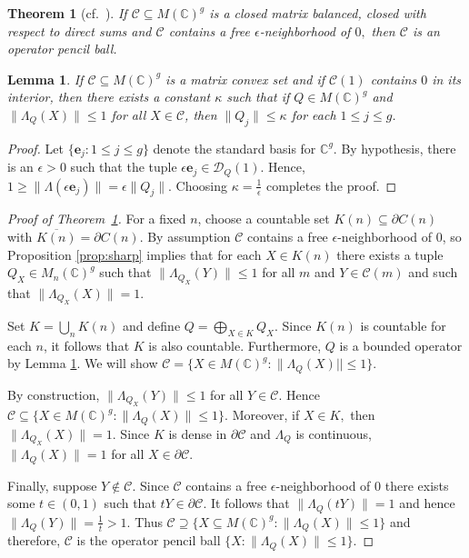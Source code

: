 \documentclass[12pt,makeidx]{amsart}
\newtheorem{lemma}[theorem]{Lemma}
\newtheorem{thm}[theorem]{Theorem}
\numberwithin{equation}{section}
\def\cD{ {{\mathcal D}}}
\def\bbF{ {\mathbb C}}
\def\cC{ {\mathcal C} }
\def\cD{ {\mathcal D} }
\def\be{\mathbf{e}}
\begin{document}
\begin{thm}[cf.~]
\label{thm:OperatorBall}
 If $\cC \subseteq M(\bbF)^g$ is a closed matrix balanced, closed with respect to direct sums  and  $\cC$ contains a free $\epsilon$-neighborhood of $0,$ then 
$\cC$ is an operator pencil ball.
\end{thm}

\begin{lemma}
 \label{lem:Qbounded}
   If $\cC \subseteq M(\bbF)^g$ is a matrix convex set and if $\cC(1)$ contains $0$ in its interior, then there exists a constant $\kappa$ such that if $Q\in M(\bbF)^g$ and $\|\Lambda_Q(X)\|\le 1$ for all $X\in \cC$, then $\|Q_j\|\le \kappa$ for each $1\le j\le g$.
\end{lemma}

\begin{proof}
 Let $\{\be_j:1\le j\le g\}$ denote the standard basis for $\bbF^g$.  By hypothesis, there is an $\epsilon>0$ such that the tuple $\epsilon \be_j \in \cD_Q(1)$. Hence, $1\ge \|\Lambda(\epsilon \be_j)\| = \epsilon \|Q_j\|$. Choosing $\kappa =\frac{1}{\epsilon}$ completes the proof.
\end{proof}

\begin{proof}[Proof of Theorem~\ref{thm:OperatorBall}]
For a fixed $n$, choose a countable set $K(n)\subseteq \partial C(n)$ with $\overline{K(n)}=\partial C(n)$. By assumption $\cC$ contains a free $\epsilon$-neighborhood of $0$, so Proposition \ref{prop:sharp} implies that for each $X \in K(n)$ there exists a tuple $Q_X\in M_n(\bbF)^g$ such that 
 $\|\Lambda_{Q_X} (Y)\|\le 1$ for all $m$ and
 $Y\in\cC(m)$  and such that  $\|\Lambda_{Q_X} (X)\|=1$. 

Set $K=\bigcup_n K(n)$ and define $Q=\bigoplus_{X \in K} Q_X
$. Since $K(n)$ is countable for each $n$, it follows that $K$ is also countable. Furthermore, 
$Q$ is a bounded operator by Lemma \ref{lem:Qbounded}.
 We will show $\cC=\{X \in M(\bbF)^g: \|\Lambda_Q(X)|| \leq 1 \}$.

By construction, $\|\Lambda_{Q_X} (Y)\| \leq 1$ for all $Y \in \cC.$ 
Hence $\cC \subseteq \{X\in M(\bbF)^g: \|\Lambda_Q(X)\| \le 1\}$. Moreover,
if $X \in K,$ then $\|\Lambda_{Q_X} (X) \|=1$.  Since $K$ is dense in $\partial \cC$ and $\Lambda_Q$ is continuous,  $\| \Lambda_Q (X) \|=1$ for all $X \in \partial \cC$.

Finally, suppose $Y \notin \cC$. Since $\cC$ contains a free $\epsilon$-neighborhood of $0$ there exists some  $t \in (0,1)$ such that $tY \in \partial \cC$. It follows that $\|\Lambda_Q (tY)\|=1$ and hence $\|\Lambda_Q (Y) \|=\frac{1}{t} >1$. Thus $\cC \supseteq\{X \subseteq M(\bbF)^g:\| \Lambda_Q (X) \|\leq 1\}$ and therefore, $\cC$ is the  operator pencil ball $\{X: \| \Lambda_Q(X)\|\le 1\}$.
\end{proof}
\end{document}
